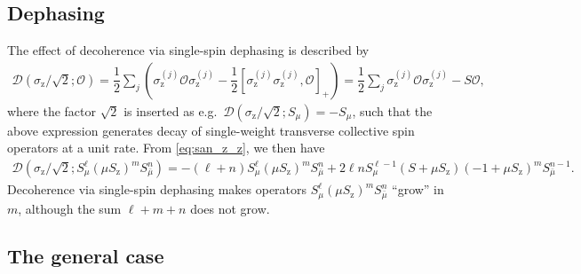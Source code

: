 \documentclass[aps,notitlepage,nofootinbib,11pt]{revtex4-1}
\newcommand{\f}[2]{\dfrac{#1}{#2}} %
\newcommand{\p}[1]{\left(#1\right)} %
\renewcommand{\sp}[1]{\left[#1\right]} %
\newcommand{\D}{\mathcal{D}}
\renewcommand{\O}{\mathcal{O}}
\newcommand{\z}{\text{z}}
\newcommand{\bmu}{{\bar\mu}}
\newcommand{\1}{\mathds{1}}
\begin{document}
\subsection{Dephasing}
\label{sec:dephasing_single}

The effect of decoherence via single-spin dephasing is described by
\begin{align}
  \D\p{\sigma_\z/\sqrt2; \O}
  = \f12 \sum_j\p{\sigma_\z^{(j)} \O \sigma_\z^{(j)}
    - \f12\sp{\sigma_\z^{(j)} \sigma_\z^{(j)},\O}_+}
  = \f12 \sum_j \sigma_\z^{(j)} \O \sigma_\z^{(j)} - S \O,
\end{align}
where the factor $\sqrt2$ is inserted as
e.g.~$\D\p{\sigma_\z/\sqrt2;S_\mu}=-S_\mu$, such that the above
expression generates decay of single-weight transverse collective spin
operators at a unit rate.  From \eqref{eq:san_z_z}, we then have
\begin{align}
  \D\p{\sigma_\z/\sqrt2; S_\mu^\ell \p{\mu S_\z}^m S_\bmu^n}
  = -\p{\ell+n} S_\mu^\ell \p{\mu S_\z}^m S_\bmu^n
  + 2 \ell n S_\mu^{\ell-1} \p{S + \mu S_\z}
  \p{-1 + \mu S_\z}^m S_\bmu^{n-1}.
\end{align}
Decoherence via single-spin dephasing makes operators
$S_\mu^\ell \p{\mu S_\z}^m S_\bmu^n$ ``grow'' in $m$, although the sum
$\ell+m+n$ does not grow.


\subsection{The general case}
\label{sec:general_single}
\end{document}
